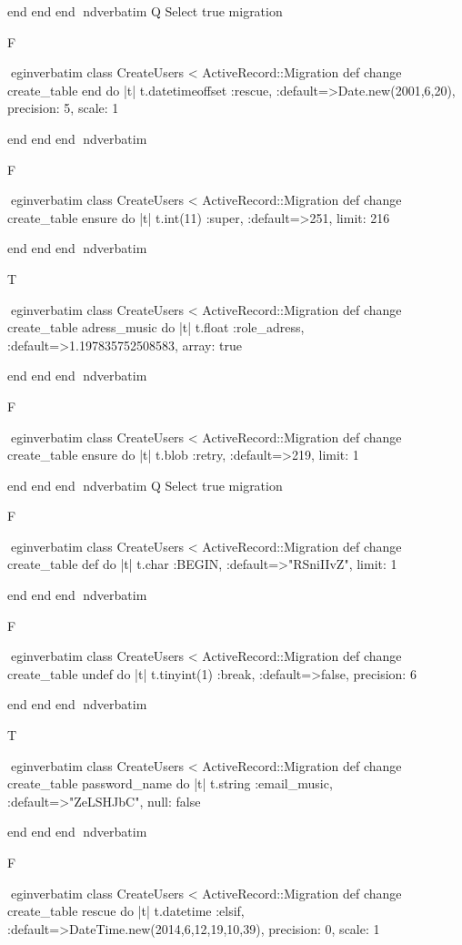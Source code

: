     end 
  end 
end
nd{verbatim}
Q
 Select true migration

F

egin{verbatim}
 class CreateUsers < ActiveRecord::Migration 
  def change 
    create_table end do |t| 
      t.datetimeoffset :rescue, :default=>Date.new(2001,6,20), precision: 5, scale: 1
    
    end 
  end 
end
nd{verbatim}

F

egin{verbatim}
 class CreateUsers < ActiveRecord::Migration 
  def change 
    create_table ensure do |t| 
      t.int(11) :super, :default=>251, limit: 216
    
    end 
  end 
end
nd{verbatim}

T

egin{verbatim}
 class CreateUsers < ActiveRecord::Migration 
  def change 
    create_table adress_music do |t| 
      t.float :role_adress, :default=>1.197835752508583, array: true
    
    end 
  end 
end
nd{verbatim}

F

egin{verbatim}
 class CreateUsers < ActiveRecord::Migration 
  def change 
    create_table ensure do |t| 
      t.blob :retry, :default=>219, limit: 1
    
    end 
  end 
end
nd{verbatim}
Q
 Select true migration

F

egin{verbatim}
 class CreateUsers < ActiveRecord::Migration 
  def change 
    create_table def do |t| 
      t.char :BEGIN, :default=>"RSniIIvZ", limit: 1
    
    end 
  end 
end
nd{verbatim}

F

egin{verbatim}
 class CreateUsers < ActiveRecord::Migration 
  def change 
    create_table undef do |t| 
      t.tinyint(1) :break, :default=>false, precision: 6
    
    end 
  end 
end
nd{verbatim}

T

egin{verbatim}
 class CreateUsers < ActiveRecord::Migration 
  def change 
    create_table password_name do |t| 
      t.string :email_music, :default=>"ZeLSHJbC", null: false
    
    end 
  end 
end
nd{verbatim}

F

egin{verbatim}
 class CreateUsers < ActiveRecord::Migration 
  def change 
    create_table rescue do |t| 
      t.datetime :elsif, :default=>DateTime.new(2014,6,12,19,10,39), precision: 0, scale: 1
    
